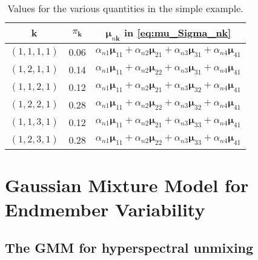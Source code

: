 \documentclass[twocolumn,english]{IEEEtran}
\providecommand{\tabularnewline}{\\}
\theoremstyle{plain}
\begin{document}
\begin{table}
\caption{Values for the various quantities in the simple example.}

\begin{centering}
\begin{tabular}{|c|c|c|}
\hline 
$\mathbf{k}$ &
$\pi_{\mathbf{k}}$ &
$\boldsymbol{\mu}_{n\mathbf{k}}$ in \eqref{eq:mu_Sigma_nk}\tabularnewline
\hline 
\hline 
$\left(1,1,1,1\right)$ &
0.06 &
$\alpha_{n1}\boldsymbol{\mu}_{11}+\alpha_{n2}\boldsymbol{\mu}_{21}+\alpha_{n3}\boldsymbol{\mu}_{31}+\alpha_{n4}\boldsymbol{\mu}_{41}$\tabularnewline
\hline 
$\left(1,2,1,1\right)$ &
0.14 &
$\alpha_{n1}\boldsymbol{\mu}_{11}+\alpha_{n2}\boldsymbol{\mu}_{22}+\alpha_{n3}\boldsymbol{\mu}_{31}+\alpha_{n4}\boldsymbol{\mu}_{41}$\tabularnewline
\hline 
$\left(1,1,2,1\right)$ &
0.12 &
$\alpha_{n1}\boldsymbol{\mu}_{11}+\alpha_{n2}\boldsymbol{\mu}_{21}+\alpha_{n3}\boldsymbol{\mu}_{32}+\alpha_{n4}\boldsymbol{\mu}_{41}$\tabularnewline
\hline 
$\left(1,2,2,1\right)$ &
0.28 &
$\alpha_{n1}\boldsymbol{\mu}_{11}+\alpha_{n2}\boldsymbol{\mu}_{22}+\alpha_{n3}\boldsymbol{\mu}_{32}+\alpha_{n4}\boldsymbol{\mu}_{41}$\tabularnewline
\hline 
$\left(1,1,3,1\right)$ &
0.12 &
$\alpha_{n1}\boldsymbol{\mu}_{11}+\alpha_{n2}\boldsymbol{\mu}_{21}+\alpha_{n3}\boldsymbol{\mu}_{33}+\alpha_{n4}\boldsymbol{\mu}_{41}$\tabularnewline
\hline 
$\left(1,2,3,1\right)$ &
0.28 &
$\alpha_{n1}\boldsymbol{\mu}_{11}+\alpha_{n2}\boldsymbol{\mu}_{22}+\alpha_{n3}\boldsymbol{\mu}_{33}+\alpha_{n4}\boldsymbol{\mu}_{41}$\tabularnewline
\hline 
\end{tabular}
\par\end{centering}
\label{table:example}
\end{table}


\section{Gaussian Mixture Model for Endmember Variability}

\subsection{The GMM for hyperspectral unmixing\label{subsec:The-GMM-for}}
\end{document}
